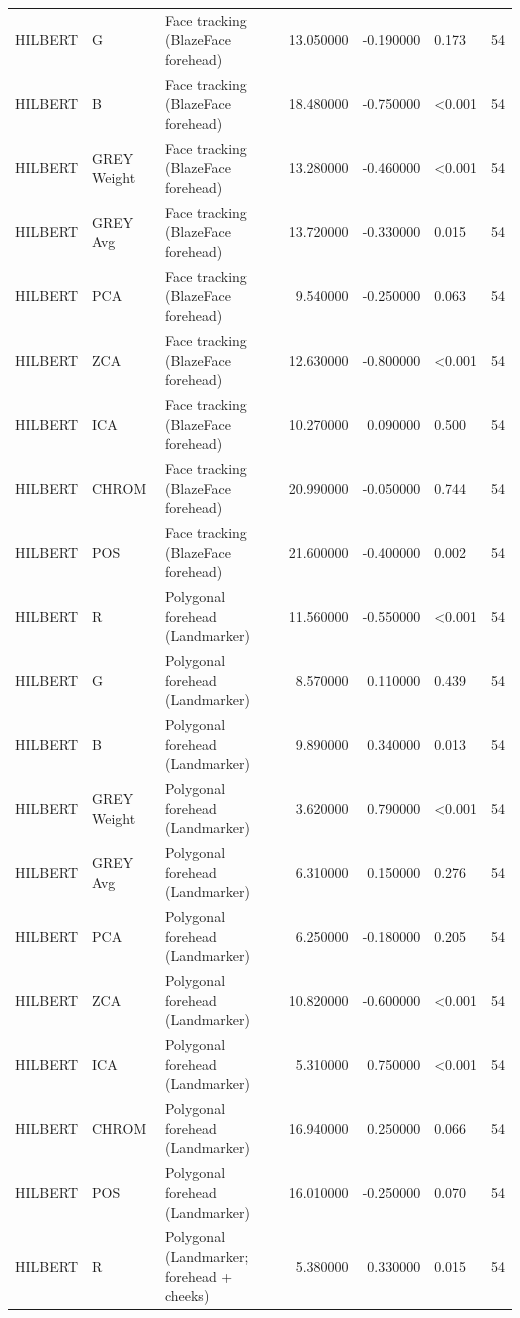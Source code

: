 \begin{table}[htbp]
\begin{tabular}{l l l r r l r}
HILBERT & G & Face tracking (BlazeFace forehead) & 13.050000 & -0.190000 & 0.173 & 54 \\
HILBERT & B & Face tracking (BlazeFace forehead) & 18.480000 & -0.750000 & <0.001 & 54 \\
HILBERT & GREY Weight & Face tracking (BlazeFace forehead) & 13.280000 & -0.460000 & <0.001 & 54 \\
HILBERT & GREY Avg & Face tracking (BlazeFace forehead) & 13.720000 & -0.330000 & 0.015 & 54 \\
HILBERT & PCA & Face tracking (BlazeFace forehead) & 9.540000 & -0.250000 & 0.063 & 54 \\
HILBERT & ZCA & Face tracking (BlazeFace forehead) & 12.630000 & -0.800000 & <0.001 & 54 \\
HILBERT & ICA & Face tracking (BlazeFace forehead) & 10.270000 & 0.090000 & 0.500 & 54 \\
HILBERT & CHROM & Face tracking (BlazeFace forehead) & 20.990000 & -0.050000 & 0.744 & 54 \\
HILBERT & POS & Face tracking (BlazeFace forehead) & 21.600000 & -0.400000 & 0.002 & 54 \\
HILBERT & R & Polygonal forehead (Landmarker) & 11.560000 & -0.550000 & <0.001 & 54 \\
HILBERT & G & Polygonal forehead (Landmarker) & 8.570000 & 0.110000 & 0.439 & 54 \\
HILBERT & B & Polygonal forehead (Landmarker) & 9.890000 & 0.340000 & 0.013 & 54 \\
HILBERT & GREY Weight & Polygonal forehead (Landmarker) & 3.620000 & 0.790000 & <0.001 & 54 \\
HILBERT & GREY Avg & Polygonal forehead (Landmarker) & 6.310000 & 0.150000 & 0.276 & 54 \\
HILBERT & PCA & Polygonal forehead (Landmarker) & 6.250000 & -0.180000 & 0.205 & 54 \\
HILBERT & ZCA & Polygonal forehead (Landmarker) & 10.820000 & -0.600000 & <0.001 & 54 \\
HILBERT & ICA & Polygonal forehead (Landmarker) & 5.310000 & 0.750000 & <0.001 & 54 \\
HILBERT & CHROM & Polygonal forehead (Landmarker) & 16.940000 & 0.250000 & 0.066 & 54 \\
HILBERT & POS & Polygonal forehead (Landmarker) & 16.010000 & -0.250000 & 0.070 & 54 \\
HILBERT & R & Polygonal (Landmarker; forehead + cheeks) & 5.380000 & 0.330000 & 0.015 & 54 \\

\end{tabular}
\end{table}
